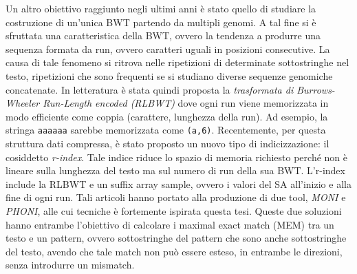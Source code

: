 \documentclass[a4paper,11pt, oneside,italian]{article}
\begin{document}
Un altro obiettivo raggiunto negli ultimi anni è stato quello di studiare la
costruzione di un'unica BWT partendo da multipli genomi.
A tal fine si è sfruttata una caratteristica della BWT, ovvero la
tendenza a produrre una sequenza formata da run, ovvero caratteri uguali in
posizioni consecutive. La causa di tale fenomeno si ritrova nelle ripetizioni di
determinate sottostringhe nel testo, ripetizioni che sono frequenti se si
studiano diverse sequenze genomiche concatenate.
%
In letteratura è stata quindi proposta la \textit{trasformata di Burrows-Wheeler
  Run-Length encoded (RLBWT)} dove ogni run viene memorizzata in modo efficiente
come coppia (carattere, lunghezza della run). Ad esempio, la stringa
\texttt{aaaaaa} sarebbe memorizzata come \texttt{(a,6)}.
Recentemente, per questa struttura dati compressa, è stato proposto un nuovo
tipo di indicizzazione: il cosiddetto \textit{r-index}. Tale indice riduce lo
spazio di memoria richiesto perché non è lineare sulla lunghezza del testo ma
sul numero di run della sua BWT.
L'r-index include la
RLBWT e un suffix array sample, ovvero i valori del SA all’inizio e alla fine di
ogni run. 
Tali articoli hanno portato alla produzione di due tool, \textit{MONI} e 
\textit{PHONI}, alle cui tecniche è fortemente ispirata questa tesi. Queste due
soluzioni hanno entrambe l'obiettivo di 
calcolare i maximal exact match (MEM) tra un testo e un pattern, ovvero
sottostringhe del pattern che 
sono anche sottostringhe del testo, avendo che tale match non può essere esteso,
in entrambe le direzioni, senza introdurre un mismatch. 
\end{document}
